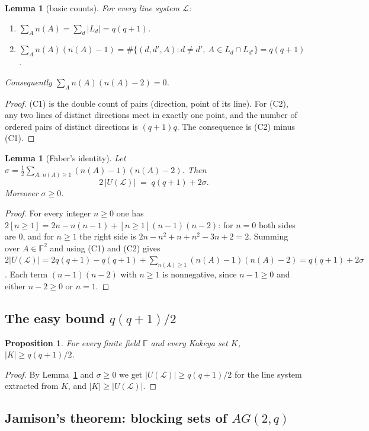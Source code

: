 \documentclass[11pt,a4paper]{article}
\newtheorem{lemma}[theorem]{Lemma}
\newtheorem{proposition}[theorem]{Proposition}
\theoremstyle{definition}
\theoremstyle{remark}
\newcommand{\F}{\mathbb{F}}
\newcommand{\Lset}{\mathcal{L}}
\begin{document}
\begin{lemma}[basic counts]\label{lem:counts}
For every line system $\Lset$:
\begin{enumerate}
\item[(C1)] $\sum_{A} n(A)=\sum_d|L_d|=q(q+1)$.
\item[(C2)] $\sum_A n(A)(n(A)-1)=\#\{(d,d',A): d\ne d',\ A\in L_d\cap L_{d'}\}=q(q+1)$.
\end{enumerate}
Consequently $\sum_A n(A)(n(A)-2)=0$.
\end{lemma}

\begin{proof}
(C1) is the double count of pairs (direction, point of its line). For (C2), any two lines of
distinct directions meet in exactly one point, and the number of ordered pairs of distinct
directions is $(q+1)q$. The consequence is (C2) minus (C1).
\end{proof}

\begin{lemma}[Faber's identity]\label{lem:faber}
Let $\sigma=\tfrac12\sum_{A:\,n(A)\ge1}(n(A)-1)(n(A)-2)$. Then
\[
2\,|U(\Lset)| \;=\; q(q+1)+2\sigma .
\]
Moreover $\sigma\ge 0$.
\end{lemma}

\begin{proof}
For every integer $n\ge0$ one has $2[n\ge1]=2n-n(n-1)+[n\ge1](n-1)(n-2)$: for $n=0$ both sides are
$0$, and for $n\ge1$ the right side is $2n-n^2+n+n^2-3n+2=2$. Summing over $A\in\F^2$ and using (C1)
and (C2) gives $2|U(\Lset)|=2q(q+1)-q(q+1)+\sum_{n(A)\ge1}(n(A)-1)(n(A)-2)=q(q+1)+2\sigma$. Each
term $(n-1)(n-2)$ with $n\ge1$ is nonnegative, since $n-1\ge0$ and either $n-2\ge0$ or $n=1$.
\end{proof}

\subsection{The easy bound $q(q+1)/2$}

\begin{proposition}\label{prop:easy}
For every finite field $\F$ and every Kakeya set $K$, $|K|\ge q(q+1)/2$.
\end{proposition}

\begin{proof}
By Lemma~\ref{lem:faber} and $\sigma\ge0$ we get $|U(\Lset)|\ge q(q+1)/2$ for the line system
extracted from $K$, and $|K|\ge|U(\Lset)|$.
\end{proof}

\subsection{Jamison's theorem: blocking sets of $AG(2,q)$}
\end{document}
